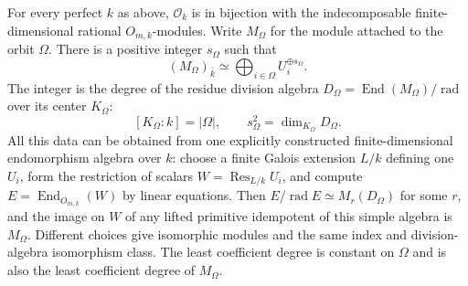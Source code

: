 \begin{theorem}
\label{C:perfect_Galois_indices}
For every perfect $k$ as above, $\mathscr O_k$ is in bijection with
the indecomposable finite-dimensional rational $O_{m,k}$-modules.
Write $M_\Omega$ for the module attached to the orbit $\Omega$.
There is a positive integer $s_\Omega$ such that
\[
 (M_\Omega)_{\bar k}
       \simeq\bigoplus_{i\in\Omega}U_i^{\oplus s_\Omega}.
                                                        \tag{C.3.G1}
\]
The integer is the degree of the residue division algebra
$D_\Omega=\operatorname{End}(M_\Omega)/\operatorname{rad}$ over
its center $K_\Omega$:
\[
 [K_\Omega:k]=|\Omega|,\qquad
 s_\Omega^2=\dim_{K_\Omega}D_\Omega.
                                                        \tag{C.3.G2}
\]
All this data can be obtained from one explicitly constructed
finite-dimensional endomorphism algebra over $k$: choose a finite
Galois extension $L/k$ defining one $U_i$, form the restriction of
scalars $W=\operatorname{Res}_{L/k}U_i$, and compute
$E=\operatorname{End}_{O_{m,k}}(W)$ by linear equations.
Then $E/\operatorname{rad}E\simeq M_r(D_\Omega)$ for some $r$,
and the image on $W$ of any lifted primitive idempotent of this
simple algebra is $M_\Omega$. Different choices give isomorphic
modules and the same index and division-algebra isomorphism class.
The least coefficient degree is constant on $\Omega$ and is also
the least coefficient degree of $M_\Omega$.
\end{theorem}
